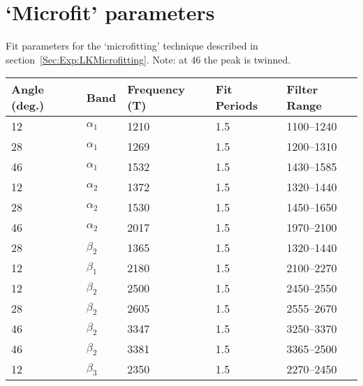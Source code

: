 \chapter{`Microfit' parameters}
\label{Appendix:MicroFitParams}

Fit parameters for the `microfitting' technique described in section~\ref{Sec:Exp:LKMicrofitting}. Note: at \unit{46}{\degree} the peak is twinned.

    \begin{center}
        {\small \begin{tabular}[!h]{lllll}
\toprule
Angle (deg.)    & Band      & Frequency (\unit{T})  & Fit Periods   & Filter Range \\
\midrule
12              & $\alpha_1$& 1210                  & 1.5           & 1100--1240     \\
28              & $\alpha_1$& 1269                  & 1.5           & 1200--1310     \\
46              & $\alpha_1$& 1532                  & 1.5           & 1430--1585     \\
12              & $\alpha_2$& 1372                  & 1.5           & 1320--1440     \\
28              & $\alpha_2$& 1530                  & 1.5           & 1450--1650     \\
46              & $\alpha_2$& 2017                  & 1.5           & 1970--2100     \\
28              & $\beta_2$ & 1365                  & 1.5           & 1320--1440     \\
12              & $\beta_1$ & 2180                  & 1.5           & 2100--2270     \\
12              & $\beta_2$ & 2500                  & 1.5           & 2450--2550     \\
28              & $\beta_2$ & 2605                  & 1.5           & 2555--2670     \\
46              & $\beta_2$ & 3347                  & 1.5           & 3250--3370     \\
46              & $\beta_2$ & 3381                  & 1.5           & 3365--2500     \\
12              & $\beta_3$ & 2350                  & 1.5           & 2270--2450     \\

\end{tabular}}
\end{center}
